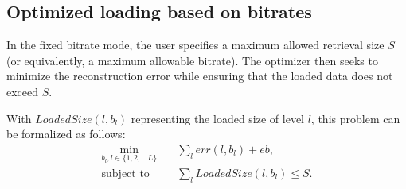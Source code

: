 


\subsection{Optimized loading based on bitrates}

In the fixed bitrate mode, the user specifies a maximum allowed retrieval size \(S\) (or equivalently, a maximum allowable bitrate). The optimizer then seeks to minimize the reconstruction error while ensuring that the loaded data does not exceed \(S\). 



With $LoadedSize(l,b_l)$ representing the loaded size of level $l$, this problem can be formalized as follows:
\[
\begin{aligned}
\min_{b_l, l \in \{1, 2, ... L\}} \quad & \sum_l err(l,b_l) + eb, \\
\text{subject to} \quad & \sum_l LoadedSize(l,b_l) \leq S.
\end{aligned}
\]

